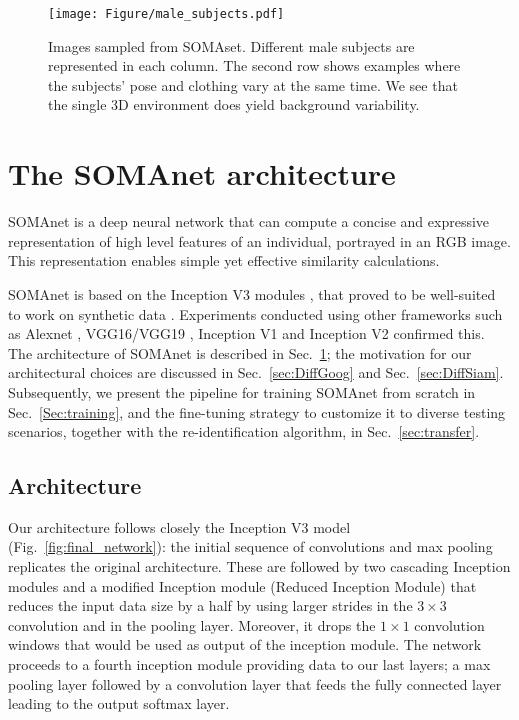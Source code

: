 \documentclass[10pt,journal,letterpaper,compsoc]{IEEEtran}
\begin{document}
\begin{figure}[!htb]
    \centering
    \texttt{[image: Figure/male\_subjects.pdf]}
    \caption{Images sampled from SOMAset. Different male subjects are represented in each column. The second row shows examples where the subjects' pose and clothing vary at the same time. We see that the single 3D environment does yield background variability.}
    \label{fig:collage}
\end{figure}

\vspace{-0.3cm}
\section{The SOMAnet architecture}
\label{sec:somanet}

SOMAnet is a deep neural network that can compute a concise and expressive representation of high level features of an individual, portrayed in an RGB image. This representation enables simple yet effective similarity calculations.

SOMAnet is based on the Inception V3 modules \cite{incep3}, that proved to be well-suited to work on synthetic data  \cite{Modelnet}. Experiments conducted using other frameworks such as Alexnet \cite{Alexnet}, VGG16/VGG19 \cite{Simonyan14c}, Inception V1 \cite{googlenet} and Inception V2 \cite{batch_norm} confirmed this.
The architecture of SOMAnet is described in Sec.~\ref{sec:somanet}; the motivation for our architectural choices
are discussed in Sec.~\ref{sec:DiffGoog} and Sec.~\ref{sec:DiffSiam}. Subsequently, we present the pipeline for training SOMAnet from scratch in Sec.~\ref{Sec:training}, and  the fine-tuning strategy to customize it to diverse testing scenarios, together with the re-identification algorithm, in Sec.~\ref{sec:transfer}.


\subsection{Architecture}

Our architecture follows closely the Inception V3 model  \cite{incep3} (Fig.~\ref{fig:final_network}): the initial sequence of convolutions and max pooling replicates  the original architecture. These are followed by two cascading Inception modules and a modified Inception module (Reduced Inception Module) that reduces the input data size by a half by using larger strides in the $3\times3$ convolution and in the pooling layer. Moreover, it drops the $1\times1$ convolution windows that would be used as output of the inception module. The network proceeds to a fourth inception module providing data to our last layers; a max pooling layer followed by a convolution layer that feeds the fully connected layer leading to the output softmax layer.
\end{document}
